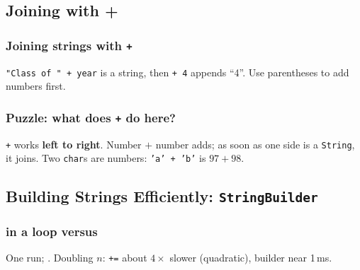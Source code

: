 \documentclass[aspectratio=169,10pt,compress]{beamer}
\begin{document}

\subsection[Plus]{Joining with +}




\begin{frame}[t,fragile] \frametitle{Joining strings with \texttt{+}}

  \vspace{0.3em}
  \small {} \texttt{"Class of " + year} is a string, then \texttt{+ 4} appends ``4''.
  Use parentheses to add numbers first.
\end{frame}




\begin{frame}[t,fragile] \frametitle{Puzzle: what does \texttt{+} do here?}

  \vspace{0.3em}
  \small \texttt{+} works \textbf{left to right}. Number $+$ number adds; as soon as one side is a \texttt{String}, it joins.
  Two \texttt{char}s are numbers: \texttt{'a' + 'b'} is $97 + 98$.
\end{frame}




\subsection[StringBuilder]{Building Strings Efficiently: \texttt{StringBuilder}}{}{}




\begin{frame}[t,fragile] \frametitle{\hCode{+=} in a loop versus }

  \vspace{0.3em}
  \small One run; . Doubling $n$: \texttt{+=} about $4\times$ slower (quadratic), builder near 1\,ms.
\end{frame}
\end{document}
